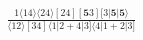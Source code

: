 \documentclass[varwidth, border=5pt]{standalone}
\begin{document}
\begin{my}
$\begin{gathered}
\scriptscriptstyle\frac{1⟨14⟩⟨24⟩[24][𝟓3][3|𝟓|𝟓⟩}{⟨12⟩[34]⟨1|2+4|3]⟨4|1+2|3]}
\end{gathered}$
\end{my}
\end{document}

